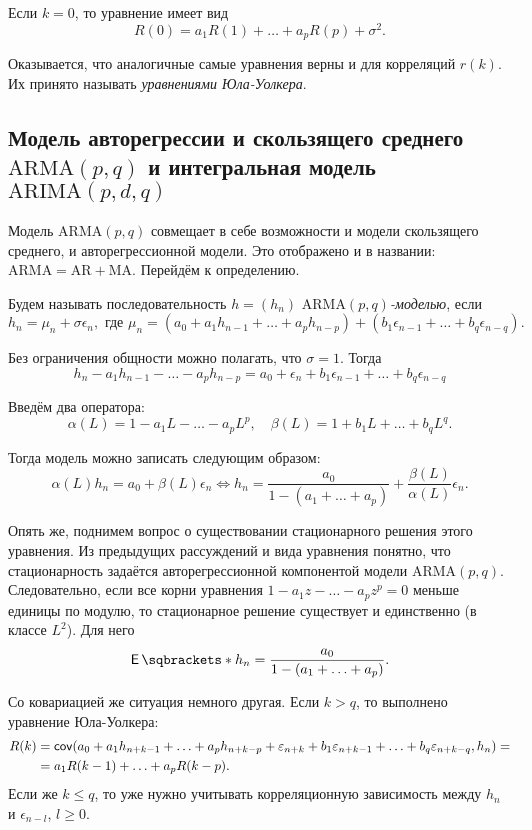Если \(k = 0\), то уравнение имеет вид
\[
	R(0) = a_{1}R(1) + \ldots + a_{p}R(p) + \sigma^{2}.
\]

Оказывается, что аналогичные самые уравнения верны и для корреляций \(r(k)\). 
Их принято называть \emph{уравнениями Юла-Уолкера}.

\subsection{Модель авторегрессии и скользящего среднего \(\mathrm{ARMA}(p, q)\) 
и интегральная модель \(\mathrm{ARIMA}(p, d, q)\)}

Модель \(\mathrm{ARMA}(p, q)\) совмещает в себе возможности и модели 
скользящего среднего, и авторегрессионной модели. Это отображено и в названии: 
\(\mathrm{ARMA} = \mathrm{AR} + \mathrm{MA}\). Перейдём к определению.

\begin{definition}
	Будем называть последовательность \(h = (h_{n})\) 
	\emph{\(\mathrm{ARMA}(p, q)\)-моделью}, если
	\[
		h_{n} = \mu_{n} + \sigma\epsilon_{n}, \text{ где } \mu_{n} = (a_{0} + 
		a_{1}h_{n - 1} + \ldots + a_{p}h_{n - p}) + (b_{1}\epsilon_{n - 
		1} + \ldots + b_{q}\epsilon_{n - q}).
	\]
\end{definition}

Без ограничения общности можно полагать, что \(\sigma = 1\). Тогда
\[
	h_{n} - a_{1}h_{n - 1} - \ldots - a_{p}h_{n - p} = a_{0} + \epsilon_{n} + 
	b_{1}\epsilon_{n - 1} + \ldots + b_{q}\epsilon_{n - q}
\]

Введём два оператора:
\[
	\alpha(L) = 1 - a_{1}L - \ldots - a_{p}L^{p}, \quad \beta(L) = 1 + b_{1}L + 
	\ldots + b_{q}L^{q}.
\]

Тогда модель можно записать следующим образом:
\[
	\alpha(L)h_{n} = a_{0} + \beta(L)\epsilon_{n} \iff h_{n} = \frac{a_{0}}{1 - 
	(a_{1} + \ldots + a_{p})} + \frac{\beta(L)}{\alpha(L)}\epsilon_{n}.
\]

Опять же, поднимем вопрос о существовании стационарного решения этого 
уравнения. Из предыдущих рассуждений и вида уравнения понятно, что 
стационарность задаётся авторегрессионной компонентой модели \(\mathrm{ARMA}(p, 
q)\). Следовательно, если все корни уравнения \(1 - a_{1}z - \ldots - 
a_{p}z^{p} = 0\) меньше единицы по модулю, то стационарное решение существует и 
единственно (в классе \(L^{2}\)). Для него
\[
	\E{h_{n}} = \frac{a_{0}}{1 - (a_{1} + \ldots + a_{p})}.
\]

Со ковариацией же ситуация немного другая. Если \(k > q\), то выполнено 
уравнение Юла-Уолкера:
\begin{align*}
	R(k) &= \operatorname{\mathsf{cov}}(a_{0} + a_{1}h_{n + k - 1} + \ldots + 
	a_{p}h_{n + k - p} + \varepsilon_{n + k} + b_{1}\varepsilon_{n + k - 1} + \ldots 
	+ b_{q}\varepsilon_{n + k - q}, h_{n}) = \\
	&= a_{1}R(k - 1) + \ldots + a_{p}R(k - p).
\end{align*}
Если же \(k \leq q\), то уже нужно учитывать корреляционную зависимость между 
\(h_{n}\) и \(\epsilon_{n - l}\), \(l \geq 0\).


